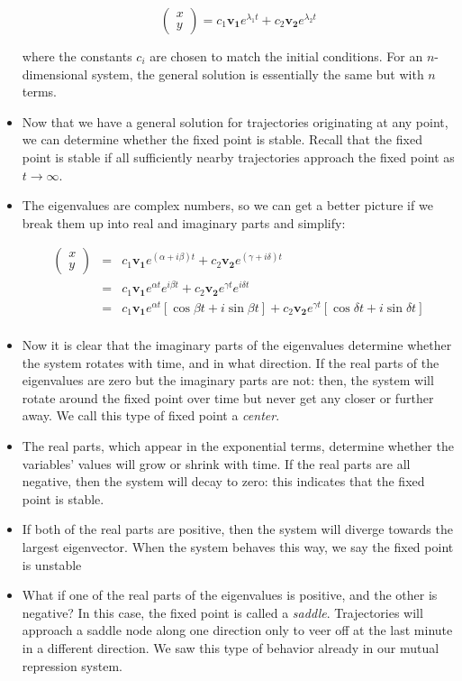 \documentclass{article}
\begin{document}
\begin{itemize}
\[ \begin{pmatrix} x\\y \end{pmatrix} = c_1 \mathbf{v_1} e^{\lambda_1 t} + c_2 \mathbf{v_2} e^{\lambda_2 t} \]

where the constants $c_i$ are chosen to match the initial conditions. For an $n$-dimensional system, the general solution is essentially the same but with $n$ terms.

\item Now that we have a general solution for trajectories originating at any point, we can determine whether the fixed point is stable. Recall that the fixed point is stable if all sufficiently nearby trajectories approach the fixed point as $t\to \infty$.

\item The eigenvalues are complex numbers, so we can get a better picture if we break them up into real and imaginary parts and simplify:

\begin{eqnarray*}
\begin{pmatrix} x\\y \end{pmatrix} & = & c_1 \mathbf{v_1} e^{\left( \alpha + i\beta \right) t} + c_2 \mathbf{v_2} e^{\left( \gamma + i\delta \right) t} \\
& = & c_1 \mathbf{v_1} e^{\alpha t} e^{i\beta t} + c_2 \mathbf{v_2} e^{\gamma t} e^{i\delta t}\\
& = & c_1 \mathbf{v_1} e^{\alpha t} \left[ \cos \beta t + i \sin  \beta t  \right] + c_2 \mathbf{v_2} e^{\gamma t} \left[ \cos \delta t + i \sin  \delta t  \right]\\
\end{eqnarray*}

\item Now it is clear that the imaginary parts of the eigenvalues determine whether the system rotates with time, and in what direction. If the real parts of the eigenvalues are zero but the imaginary parts are not: then, the system will rotate around the fixed point over time but never get any closer or further away.  We call this type of fixed point a \textit{center}.

\item The real parts, which appear in the exponential terms, determine whether the variables' values will grow or shrink with time. If the real parts are all negative, then the system will decay to zero: this indicates that the fixed point is stable.

\item If both of the real parts are positive, then the system will diverge towards the largest eigenvector. When the system behaves this way, we say the fixed point is unstable

\item What if one of the real parts of the eigenvalues is positive, and the other is negative? In this case, the fixed point is called a \textit{saddle}. Trajectories will approach a saddle node along one direction only to veer off at the last minute in a different direction. We saw this type of behavior already in our mutual repression system.
\end{itemize}
\end{document}
